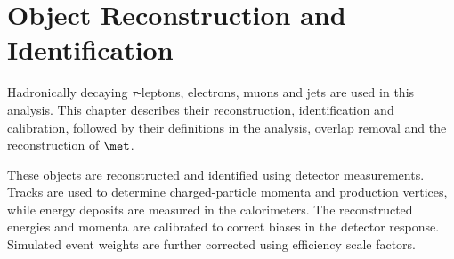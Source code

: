 \chapter{Object Reconstruction and Identification}
\label{chapter:object_reconstruction}

Hadronically decaying $\tau$-leptons, electrons, muons and jets are used in this analysis.
This chapter describes their reconstruction, identification and calibration, followed by their definitions in the analysis, overlap removal and the reconstruction of $\met$.

These objects are reconstructed and identified using detector measurements.
Tracks are used to determine charged-particle momenta and production vertices, while energy deposits are measured in the calorimeters.
The reconstructed energies and momenta are calibrated to correct biases in the detector response.
Simulated event weights are further corrected using efficiency scale factors.









% 


